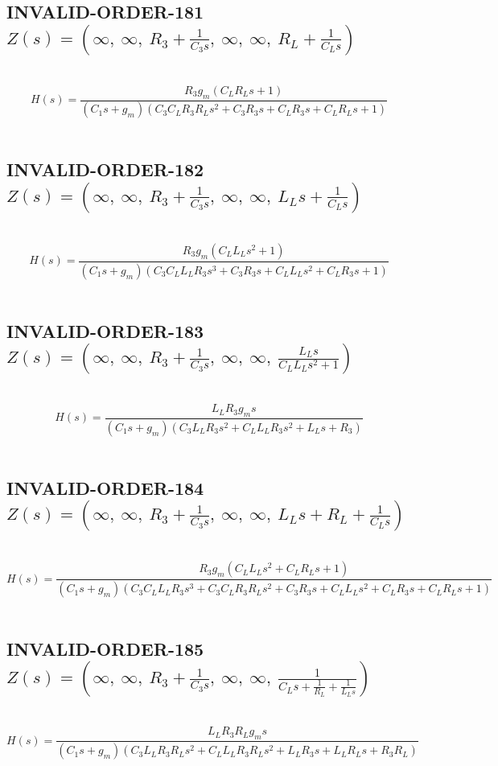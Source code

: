 \documentclass{article}
\begin{document}
\subsection{INVALID-ORDER-181 $Z(s) = \left( \infty, \  \infty, \  R_{3} + \frac{1}{C_{3} s}, \  \infty, \  \infty, \  R_{L} + \frac{1}{C_{L} s}\right)$ } \ 
\textbf{\[H(s) = \frac{R_{3} g_{m} \left(C_{L} R_{L} s + 1\right)}{\left(C_{1} s + g_{m}\right) \left(C_{3} C_{L} R_{3} R_{L} s^{2} + C_{3} R_{3} s + C_{L} R_{3} s + C_{L} R_{L} s + 1\right)}\] } \ 
\subsection{INVALID-ORDER-182 $Z(s) = \left( \infty, \  \infty, \  R_{3} + \frac{1}{C_{3} s}, \  \infty, \  \infty, \  L_{L} s + \frac{1}{C_{L} s}\right)$ } \ 
\textbf{\[H(s) = \frac{R_{3} g_{m} \left(C_{L} L_{L} s^{2} + 1\right)}{\left(C_{1} s + g_{m}\right) \left(C_{3} C_{L} L_{L} R_{3} s^{3} + C_{3} R_{3} s + C_{L} L_{L} s^{2} + C_{L} R_{3} s + 1\right)}\] } \ 
\subsection{INVALID-ORDER-183 $Z(s) = \left( \infty, \  \infty, \  R_{3} + \frac{1}{C_{3} s}, \  \infty, \  \infty, \  \frac{L_{L} s}{C_{L} L_{L} s^{2} + 1}\right)$ } \ 
\textbf{\[H(s) = \frac{L_{L} R_{3} g_{m} s}{\left(C_{1} s + g_{m}\right) \left(C_{3} L_{L} R_{3} s^{2} + C_{L} L_{L} R_{3} s^{2} + L_{L} s + R_{3}\right)}\] } \ 
\subsection{INVALID-ORDER-184 $Z(s) = \left( \infty, \  \infty, \  R_{3} + \frac{1}{C_{3} s}, \  \infty, \  \infty, \  L_{L} s + R_{L} + \frac{1}{C_{L} s}\right)$ } \ 
\textbf{\[H(s) = \frac{R_{3} g_{m} \left(C_{L} L_{L} s^{2} + C_{L} R_{L} s + 1\right)}{\left(C_{1} s + g_{m}\right) \left(C_{3} C_{L} L_{L} R_{3} s^{3} + C_{3} C_{L} R_{3} R_{L} s^{2} + C_{3} R_{3} s + C_{L} L_{L} s^{2} + C_{L} R_{3} s + C_{L} R_{L} s + 1\right)}\] } \ 
\subsection{INVALID-ORDER-185 $Z(s) = \left( \infty, \  \infty, \  R_{3} + \frac{1}{C_{3} s}, \  \infty, \  \infty, \  \frac{1}{C_{L} s + \frac{1}{R_{L}} + \frac{1}{L_{L} s}}\right)$ } \ 
\textbf{\[H(s) = \frac{L_{L} R_{3} R_{L} g_{m} s}{\left(C_{1} s + g_{m}\right) \left(C_{3} L_{L} R_{3} R_{L} s^{2} + C_{L} L_{L} R_{3} R_{L} s^{2} + L_{L} R_{3} s + L_{L} R_{L} s + R_{3} R_{L}\right)}\] } \ 
\end{document}
